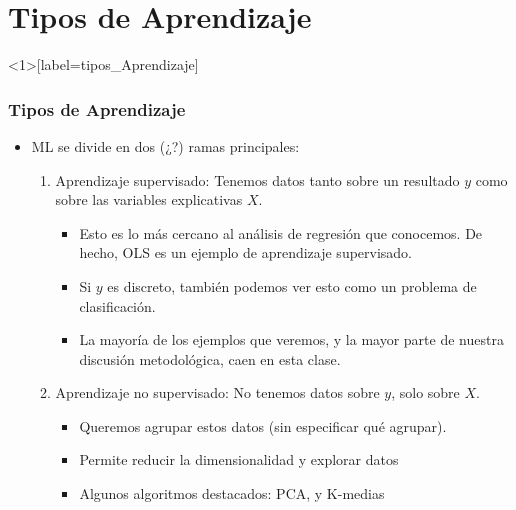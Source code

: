 \documentclass[
  shownotes,
  xcolor={svgnames},
  hyperref={colorlinks,citecolor=DarkBlue,linkcolor=DarkRed,urlcolor=DarkBlue}
  , aspectratio=169]{beamer}
\begin{document}
\section{Tipos de Aprendizaje}
 \begin{frame}[noframenumbering]
\tableofcontents[currentsubsection]

\end{frame}
\begin{frame}<1>[label=tipos_Aprendizaje]
\frametitle{Tipos de Aprendizaje}
\begin{itemize}


\item ML se divide en dos (¿?) ramas principales:
\medskip
  \begin{enumerate}

  \item Aprendizaje supervisado: Tenemos datos tanto sobre un resultado $y$ como sobre las variables explicativas $X$.
    \begin{itemize}
      \item Esto es lo más cercano al análisis de regresión que conocemos. De hecho, OLS es un  ejemplo de aprendizaje supervisado.
      \item Si $y$ es discreto, también podemos ver esto como un problema de clasificación.
      \item La mayoría de los ejemplos que veremos, y la mayor parte de nuestra discusión metodológica, caen en esta clase.
    \end{itemize}


  \pause
  \item  Aprendizaje no supervisado: No tenemos datos sobre $y$, solo sobre $X$.

  \begin{itemize}
    \item Queremos agrupar estos datos (sin especificar qué agrupar).
    \item Permite reducir la dimensionalidad y explorar datos
    \item Algunos algoritmos destacados: PCA, y  K-medias
  \end{itemize}

  \end{enumerate}
\end{itemize}
\end{frame}
\end{document}
